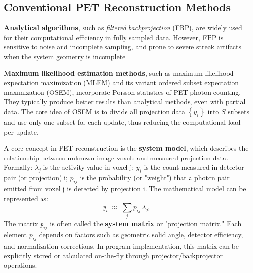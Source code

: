 \documentclass[
reprint,
superscriptaddress,
nofootinbib,
amsmath,amssymb,
aps,
prd,
]{revtex4-2}
\begin{document}
\subsection{Conventional PET Reconstruction Methods}


\textbf{Analytical algorithms}, such as \emph{filtered backprojection} (FBP), are widely used for their computational efficiency in fully sampled data. However, FBP is sensitive to noise and incomplete sampling, and prone to severe streak artifacts when the system geometry is incomplete.


\textbf{Maximum likelihood estimation methods}, such as maximum likelihood expectation maximization (MLEM) and its variant ordered subset expectation maximization (OSEM)\cite{363108}, incorporate Poisson statistics of PET photon counting. They typically produce better results than analytical methods, even with partial data.
The core idea of OSEM is to divide all projection data $\left\{y_i\right\}$ into $S$ subsets and use only one subset for each update, thus reducing the computational load per update.

A core concept in PET reconstruction is the \textbf{system model}, which describes the relationship between unknown image voxels and measured projection data. Formally: $\lambda_j$ is the activity value in voxel j; $y_i$ is the count measured in detector pair (or projection) i; $p_{ij}$ is the probability (or "weight") that a photon pair emitted from voxel j is detected by projection i.
The mathematical model can be represented as:
\begin{equation}
    y_i \;\approx\; \sum_{j} p_{ij}\,\lambda_j,
\end{equation}
The matrix $p_{ij}$ is often called the \textbf{system matrix} or "projection matrix." Each element $p_{ij}$ depends on factors such as geometric solid angle, detector efficiency, and normalization corrections. In program implementation, this matrix can be explicitly stored or calculated on-the-fly through projector/backprojector operations.
\end{document}
